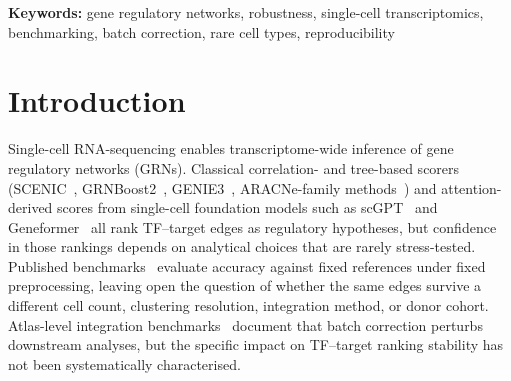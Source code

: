 \documentclass[12pt]{article}
\begin{document}
\begin{abstract}
(Spearman $\approx 0$, sign-flip 44--47\%);
(vi)~scGPT attention rankings are statistically uncorrelated with
classical-scorer rankings on matched kidney cells (Spearman
$\rho \leq 0.20$, top-100 Jaccard $\leq 0.06$), so within-scorer
fragility profiles do not transfer across scorer families.
A degree-preserving edge-rewire null is cleared at $p = 0.02$ on every
cohort, rebutting the possibility that the within-coarse-shuffle
failures reflect null over-stringency rather than genuine signal loss.
No single cohort passes all five axes under calibrated criteria.\\
\textbf{Availability and Implementation:}
The unified fragility package, reproducing every CSV and figure from raw
h5ad, is at \url{https://github.com/Biodyn-AI/grn-robustness-audit} and
archived at \url{https://doi.org/10.5281/zenodo.20009065}.\\
\textbf{Contact:} \href{mailto:ihor.kendiukhov@student.uni-tuebingen.de}{ihor.kendiukhov@student.uni-tuebingen.de}\\
\textbf{Supplementary Information:}
Supplementary figures (full Jaccard-vs-cell-count curves, weight-simplex
sweep, 5{,}880-point threshold-sensitivity heatmap, triple-null calibration,
gene-dimension and normalization ablations) are available at
\textit{Bioinformatics} online.\end{abstract}

\noindent\textbf{Keywords:} gene regulatory networks, robustness, single-cell transcriptomics, benchmarking, batch correction, rare cell types, reproducibility

\maketitle

\section{Introduction}

Single-cell RNA-sequencing enables transcriptome-wide inference of
gene regulatory networks (GRNs). Classical correlation- and tree-based
scorers (SCENIC~\citep{Aibar2017}, GRNBoost2~\citep{Moerman2019},
GENIE3~\citep{Huynh-Thu2010}, ARACNe-family
methods~\citep{Margolin2006}) and attention-derived scores from
single-cell foundation models such as scGPT~\citep{Cui2024} and
Geneformer~\citep{Theodoris2023} all rank TF--target edges as regulatory
hypotheses, but confidence in those rankings depends on analytical
choices that are rarely stress-tested. Published
benchmarks~\citep{Pratapa2020, Chen2018} evaluate accuracy against
fixed references under fixed preprocessing, leaving open the question
of whether the same edges survive a different cell count, clustering
resolution, integration method, or donor cohort. Atlas-level
integration benchmarks~\citep{Luecken2022, Tran2020} document that
batch correction perturbs downstream analyses, but the specific impact
on TF--target ranking stability has not been systematically
characterised.
\end{document}

